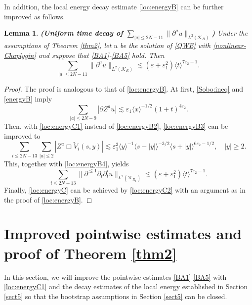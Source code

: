 \documentclass[11pt,twoside]{article}
\def\cK{\mathcal K}
\def\ds{\displaystyle}
\def\p{\partial}
\def\ve{\varepsilon}
\def\ls{\lesssim}
\newcommand{\w}[1]{\langle {#1} \rangle}
\theoremstyle{plain}
\newtheorem{lemma}[theorem]{Lemma}
\theoremstyle{definition}
\numberwithin{equation}{section}
\begin{document}
In addition, the local energy decay estimate \eqref{loc:energyB} can be further improved as follows.
\begin{lemma}
{\bf (Uniform time decay of $\ds\sum_{|a|\le2N-11}\|\p^au\|_{L^2(\cK_R)}$)}
Under the assumptions of Theorem \ref{thm2}, let $u$ be the solution of \eqref{QWE} with \eqref{nonlinear-Chaplygin} and suppose that \eqref{BA1}-\eqref{BA5} hold.
Then
\begin{equation}\label{loc:energyC}
\sum_{|a|\le2N-11}\|\p^au\|_{L^2(\cK_R)}\ls(\ve+\ve_1^2)\w{t}^{7\ve_2-1}.
\end{equation}
\end{lemma}
\begin{proof}
The proof is analogous to that of \eqref{loc:energyB}.
At first, \eqref{Sobo:ineq} and \eqref{energyB} imply
\begin{equation}\label{loc:energyC1}
\sum_{|a|\le2N-9}|\p Z^au|\ls\ve_1\w{x}^{-1/2}(1+t)^{4\ve_2}.
\end{equation}
Then, with \eqref{loc:energyC1} instead of \eqref{loc:energyB2}, \eqref{loc:energyB3} can be improved to
\begin{equation*}
\sum_{i\le2N-13}\sum_{|a|\le2}|Z^a\Box\tilde V_i(s,y)|\ls\ve_1^3\w{y}^{-1}\w{s-|y|}^{-3/2}\w{s+|y|}^{6\ve_2-1/2},\quad|y|\ge2.
\end{equation*}
This, together with \eqref{loc:energyB4}, yields
\begin{equation}\label{loc:energyC2}
\sum_{i\le2N-13}\|\p^{\le1}\p_t\p_t^iu\|_{L^2(\cK_{R_1})}\ls(\ve+\ve_1^2)\w{t}^{7\ve_2-1}.
\end{equation}
Finally, \eqref{loc:energyC} can be achieved by \eqref{loc:energyC2} with an argument as in the proof of \eqref{loc:energyB}.
\end{proof}


\section{Improved pointwise estimates and proof of Theorem \ref{thm2}}\label{sect6}


In this section, we will improve the pointwise estimates \eqref{BA1}-\eqref{BA5} with \eqref{loc:energyC1}
and the decay estimates of the local energy established in Section \ref{sect5} so that the
bootstrap assumptions in Section \ref{sect5} can be closed.
\end{document}
